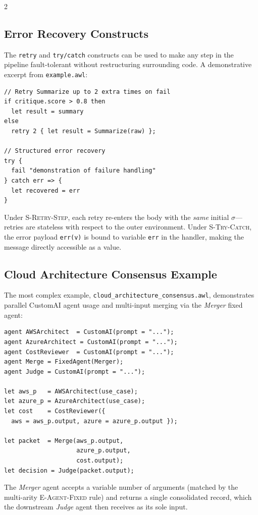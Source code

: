 \documentclass[10pt]{article}
\begin{document}
\begin{multicols}{2}
\subsection{Error Recovery Constructs}

The \texttt{retry} and \texttt{try/catch} constructs can be used to
make any step in the pipeline fault-tolerant without restructuring
surrounding code.  A demonstrative excerpt from \texttt{example.awl}:

\begin{lstlisting}[style=awl]
// Retry Summarize up to 2 extra times on fail
if critique.score > 0.8 then
  let result = summary
else
  retry 2 { let result = Summarize(raw) };

// Structured error recovery
try {
  fail "demonstration of failure handling"
} catch err => {
  let recovered = err
}
\end{lstlisting}

Under \textsc{S-Retry-Step}, each retry re-enters the body with the
\emph{same} initial $\sigma$---retries are stateless with respect to
the outer environment.  Under \textsc{S-Try-Catch}, the error payload
\texttt{err(v)} is bound to variable \texttt{err} in the handler,
making the message directly accessible as a value.

\subsection{Cloud Architecture Consensus Example}

The most complex example,
\texttt{cloud\_architecture\_consensus.awl}, demonstrates parallel
CustomAI agent usage and multi-input merging via the \textit{Merger}
fixed agent:

\begin{lstlisting}[style=awl]
agent AWSArchitect  = CustomAI(prompt = "...");
agent AzureArchitect = CustomAI(prompt = "...");
agent CostReviewer  = CustomAI(prompt = "...");
agent Merge = FixedAgent(Merger);
agent Judge = CustomAI(prompt = "...");

let aws_p   = AWSArchitect(use_case);
let azure_p = AzureArchitect(use_case);
let cost    = CostReviewer({
  aws = aws_p.output, azure = azure_p.output });

let packet  = Merge(aws_p.output,
                    azure_p.output,
                    cost.output);
let decision = Judge(packet.output);
\end{lstlisting}

The \textit{Merger} agent accepts a variable number of arguments
(matched by the multi-arity \textsc{E-Agent-Fixed} rule) and returns a
single consolidated record, which the downstream \textit{Judge} agent
then receives as its sole input.


\end{multicols}
\end{document}
